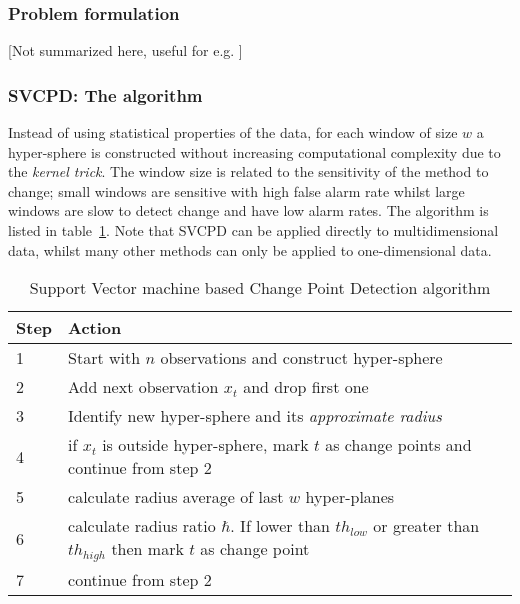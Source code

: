 \subsubsection{Problem formulation}
[Not summarized here, useful for e.g. ]

\subsubsection{SVCPD: The algorithm}
Instead of using statistical properties of the data, for each window of size $w$ a hyper-sphere is constructed without increasing computational complexity due to the \emph{kernel trick}.
The window size is related to the sensitivity of the method to change; small windows are sensitive with high false alarm rate whilst large windows are slow to detect change and have low alarm rates.
The algorithm is listed in table~\ref{tab:alg-svcdp}.
Note that SVCPD can be applied directly to multidimensional data, whilst many other methods can only be applied to one-dimensional data.

\begin{center}\begin{table}
\begin{tabular}{ l p{12cm} }
  \hline
  Step & Action \\
  \hline
  1 & Start with $n$ observations and construct hyper-sphere \\
  2 & Add next observation $x_t$ and drop first one \\
  3 & Identify new hyper-sphere and its \emph{approximate radius} \\
  4 & if $x_t$ is outside hyper-sphere, mark $t$ as change points and continue from step 2 \\
  5 & calculate radius average of last $w$ hyper-planes \\
  6 & calculate radius ratio $\hbar$. If lower than ${th}_{low}$ or greater than ${th}_{high}$ then mark $t$ as change point \\
  7 & continue from step 2 \\
  \hline
\end{tabular}
\caption[\gls{svcpd} algorithm]{Support Vector machine based Change Point Detection algorithm}
\label{tab:alg-svcdp}
\end{table}\end{center}





